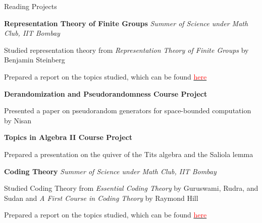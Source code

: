 
\begin{rubric}{Reading Projects}

	\entry*[2022] \textbf{Representation Theory of Finite Groups} \hfill \emph{Summer of Science under Math Club, IIT Bombay}

		Studied representation theory from \emph{Representation Theory of Finite Groups} by Benjamin Steinberg

		Prepared a report on the topics studied, which can be found \href{https://amitrajaraman.github.io/notes/rep-th/main.pdf}{\textcolor{red}{here}}

	\entry*[2022\phantom{}] \textbf{Derandomization and Pseudorandomness Course Project}

		Presented a paper on pseudorandom generators for space-bounded computation by Nisan

	\entry*[2020\phantom{}] \textbf{Topics in Algebra II Course Project}

		Prepared a presentation on the quiver of the Tits algebra and the Saliola lemma

	\entry*[2020] \textbf{Coding Theory} \hfill \emph{Summer of Science under Math Club, IIT Bombay}

		Studied Coding Theory from \textit{Essential Coding Theory} by Guruswami, Rudra, and Sudan and \textit{A First Course in Coding Theory} by Raymond Hill
		

		Prepared a report on the topics studied, which can be found \href{https://amitrajaraman.github.io/notes/coding-th/Coding_Theory.pdf}{\textcolor{red}{here}}





        
\end{rubric}